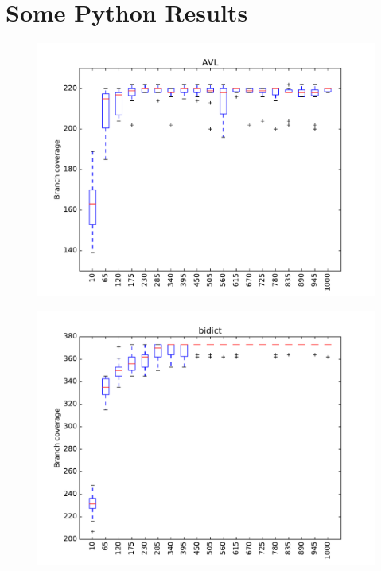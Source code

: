 \section{Some Python Results}



\begin{figure}
\includegraphics[width=\columnwidth]{graphs/AVLrand120}
\end{figure}


\begin{figure}
\includegraphics[width=\columnwidth]{graphs/bidictrand120}
\end{figure}


